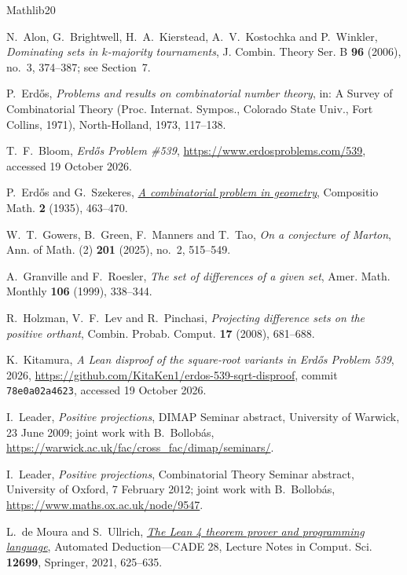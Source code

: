 \documentclass[11pt]{amsart}
\theoremstyle{definition}
\theoremstyle{remark}
\begin{document}
\begin{thebibliography}{Mathlib20}

N.~Alon, G.~Brightwell, H.~A.~Kierstead, A.~V.~Kostochka and P.~Winkler, \emph{Dominating sets in $k$-majority tournaments}, J. Combin. Theory Ser. B \textbf{96} (2006), no.~3, 374--387; see Section~7.

P.~Erd\H{o}s, \emph{Problems and results on combinatorial number theory}, in: A Survey of Combinatorial Theory (Proc. Internat. Sympos., Colorado State Univ., Fort Collins, 1971), North-Holland, 1973, 117--138.

T.~F.~Bloom, \emph{Erd\H{o}s Problem \#539}, \url{https://www.erdosproblems.com/539}, accessed 19 October 2026.

P.~Erd\H{o}s and G.~Szekeres, \emph{\href{https://numdam.org/item/CM_1935__2__463_0/}{A combinatorial problem in geometry}}, Compositio Math. \textbf{2} (1935), 463--470.

W.~T.~Gowers, B.~Green, F.~Manners and T.~Tao, \emph{On a conjecture of Marton}, Ann. of Math. (2) \textbf{201} (2025), no.~2, 515--549.

A.~Granville and F.~Roesler, \emph{The set of differences of a given set}, Amer. Math. Monthly \textbf{106} (1999), 338--344.

R.~Holzman, V.~F.~Lev and R.~Pinchasi, \emph{Projecting difference sets on the positive orthant}, Combin. Probab. Comput. \textbf{17} (2008), 681--688.

K.~Kitamura, \emph{A Lean disproof of the square-root variants in Erd\H{o}s Problem 539}, 2026, \url{https://github.com/KitaKen1/erdos-539-sqrt-disproof}, commit \texttt{78e0a02a4623}, accessed 19 October 2026.

I.~Leader, \emph{Positive projections}, DIMAP Seminar abstract, University of Warwick, 23 June 2009; joint work with B.~Bollob\'as, \url{https://warwick.ac.uk/fac/cross_fac/dimap/seminars/}.

I.~Leader, \emph{Positive projections}, Combinatorial Theory Seminar abstract, University of Oxford, 7 February 2012; joint work with B.~Bollob\'as, \url{https://www.maths.ox.ac.uk/node/9547}.

L.~de Moura and S.~Ullrich, \emph{\href{https://doi.org/10.1007/978-3-030-79876-5_37}{The Lean 4 theorem prover and programming language}}, Automated Deduction---CADE 28, Lecture Notes in Comput. Sci. \textbf{12699}, Springer, 2021, 625--635.


\end{thebibliography}
\end{document}
